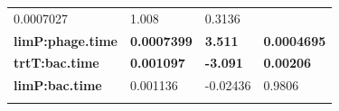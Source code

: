 \documentclass[]{article}
\begin{document}
\begin{longtable}[]{@{}llll@{}}
\begin{minipage}[t]{0.17\columnwidth}
0.0007027\strut
\end{minipage} & \begin{minipage}[t]{0.13\columnwidth}\raggedright\strut
1.008\strut
\end{minipage} & \begin{minipage}[t]{0.16\columnwidth}\raggedright\strut
0.3136\strut
\end{minipage}\tabularnewline
\begin{minipage}[t]{0.43\columnwidth}\raggedright\strut
\textbf{limP:phage.time}\strut
\end{minipage} & \begin{minipage}[t]{0.17\columnwidth}\raggedright\strut
\textbf{0.0007399}\strut
\end{minipage} & \begin{minipage}[t]{0.13\columnwidth}\raggedright\strut
\textbf{3.511}\strut
\end{minipage} & \begin{minipage}[t]{0.16\columnwidth}\raggedright\strut
\textbf{0.0004695}\strut
\end{minipage}\tabularnewline
\begin{minipage}[t]{0.43\columnwidth}\raggedright\strut
\textbf{trtT:bac.time}\strut
\end{minipage} & \begin{minipage}[t]{0.17\columnwidth}\raggedright\strut
\textbf{0.001097}\strut
\end{minipage} & \begin{minipage}[t]{0.13\columnwidth}\raggedright\strut
\textbf{-3.091}\strut
\end{minipage} & \begin{minipage}[t]{0.16\columnwidth}\raggedright\strut
\textbf{0.00206}\strut
\end{minipage}\tabularnewline
\begin{minipage}[t]{0.43\columnwidth}\raggedright\strut
\textbf{limP:bac.time}\strut
\end{minipage} & \begin{minipage}[t]{0.17\columnwidth}\raggedright\strut
0.001136\strut
\end{minipage} & \begin{minipage}[t]{0.13\columnwidth}\raggedright\strut
-0.02436\strut
\end{minipage} & \begin{minipage}[t]{0.16\columnwidth}\raggedright\strut
0.9806\strut
\end{minipage}\tabularnewline
\begin{minipage}[t]{0.43\columnwidth}\raggedright\strut

\end{minipage}
\end{longtable}
\end{document}
